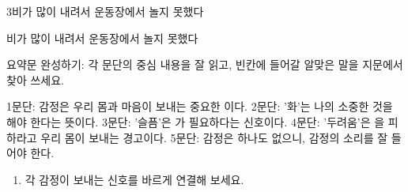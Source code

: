 \documentclass[fs12,seriesSau]{korfarm-base}
\begin{document}
\begin{kfSentenceUnit}{3}{비가 많이 내려서 운동장에서 놀지 못했다}
\begin{kfChoices}
\kfChoice 비가 많이 내려서
\kfChoice 운동장에서 놀지 못했다
\end{kfChoices}
\end{kfSentenceUnit}

\kfActivityBg {}
\par{}\par\nopagebreak[4]\smallskip\nopagebreak[4]

\kfActivityBg \par{}\par\nopagebreak[4]\smallskip\nopagebreak[4]
\begin{kfBlankList}
\kfBlankItem 요약문 완성하기: 각 문단의 중심 내용을 잘 읽고, 빈칸에 들어갈 알맞은 말을 지문에서 찾아 쓰세요.

1문단: 감정은 우리 몸과 마음이 보내는 중요한 \kfFillBlank[42mm]{}이다. 2문단: '화'는 나의 소중한 것을 \kfFillBlank[42mm]{}해야 한다는 뜻이다. 3문단: '슬픔'은 \kfFillBlank[42mm]{}가 필요하다는 신호이다. 4문단: '두려움'은 \kfFillBlank[42mm]{}을 피하라고 우리 몸이 보내는 경고이다. 5문단: \kfFillBlank[42mm]{} 감정은 하나도 없으니, 감정의 소리를 잘 들어야 한다.
\end{kfBlankList}

\kfActivityBg \par{}\par\nopagebreak[4]\smallskip\nopagebreak[4]

\kfActivityBg \par{}\par\nopagebreak[4]\smallskip\nopagebreak[4]
\begin{enumerate}[leftmargin=22pt, itemsep=6pt, topsep=4pt, label=\textbf{\arabic*.}]
\item 각 감정이 보내는 신호를 바르게 연결해 보세요.
\end{enumerate}
\end{document}
